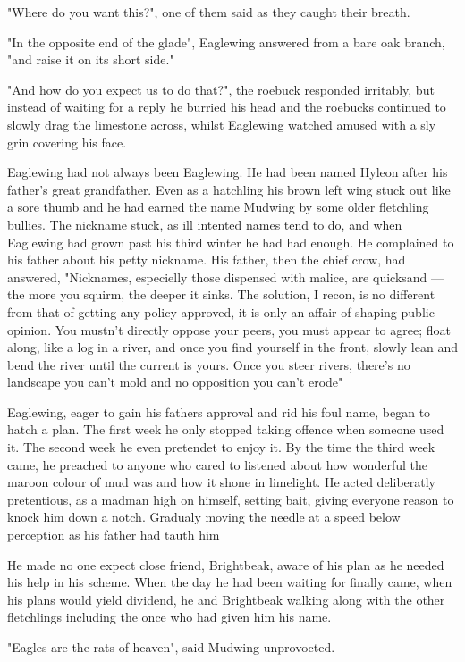 \documentclass[smalldemyvopaper,11pt,twoside,onecolumn,openright,extrafontsizes]{memoir}
\begin{document}
"Where do you want this?", one of them said as they caught their breath.

"In the opposite end of the glade", Eaglewing answered from a bare oak branch, "and raise it on its short side."

"And how do you expect us to do that?", the roebuck responded irritably, but instead of waiting for a reply he burried his head and the roebucks continued to slowly drag the limestone across, whilst Eaglewing watched amused with a sly grin covering his face.  
	
Eaglewing had not always been Eaglewing. He had been named Hyleon after his father's great grandfather. Even as a hatchling his brown left wing stuck out like a sore thumb and he had earned the name Mudwing by some older fletchling bullies. The nickname stuck, as ill intented names tend to do, and when Eaglewing had grown past his third winter he had had enough. He  complained to his father about his petty nickname. His father, then the chief crow, had answered, "Nicknames, especielly those dispensed with malice, are quicksand — the more you squirm, the deeper it sinks. The solution, I recon, is no different from that of getting any policy approved, it is only an affair of shaping public opinion. You mustn't directly oppose your peers, you must appear to agree; float along, like a log in a river, and once you find yourself in the front, slowly lean and bend the river until the current is yours. Once you steer rivers, there's no landscape you can't mold and no opposition you can't erode"

Eaglewing, eager to gain his fathers approval and rid his foul name, began to hatch a plan. The first week he only stopped taking offence when someone used it. The second week he even pretendet to enjoy it. By the time the third week came, he preached to anyone who cared to listened about how wonderful the maroon colour of mud was and how it shone in limelight. He acted deliberatly pretentious, as a madman high on himself, setting bait, giving everyone reason to knock him down a notch. Gradualy moving the needle at a speed below perception as his father had tauth him

He made no one expect close friend, Brightbeak, aware of his plan as he needed his help in his scheme. When the day he had been waiting for finally came, when his plans would yield dividend, he and Brightbeak walking along with the other fletchlings including the once who had given him his name.

"Eagles are the rats of heaven", said Mudwing unprovocted.
\end{document}
